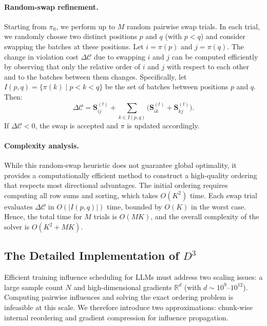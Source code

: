 \paragraph{Random-swap refinement.}
Starting from $\pi_0$, we perform up to $M$ random pairwise swap trials. 
In each trial, we randomly choose two distinct positions $p$ and $q$ (with $p<q$) and consider swapping the batches at these positions. 
Let $i = \pi(p)$ and $j = \pi(q)$. 
The change in violation cost $\Delta\mathcal{C}$ due to swapping $i$ and $j$ can be computed efficiently by observing that only the relative order of $i$ and $j$ with respect to each other and to the batches between them changes. 
Specifically, let $I(p,q) = \{\pi(k) \mid p < k < q\}$ be the set of batches between positions $p$ and $q$. 
Then:
{
\setlength{\abovedisplayskip}{8pt}
\setlength{\belowdisplayskip}{8pt}
\[
\Delta\mathcal{C} = \mathbf{S}^{(t)}_{ij} + \sum_{k \in I(p,q)} \bigl(\mathbf{S}^{(t)}_{ik} + \mathbf{S}^{(t)}_{kj}\bigr).
\]
If $\Delta\mathcal{C} < 0$, the swap is accepted and $\pi$ is updated accordingly.
}

\paragraph{Complexity analysis.}
While this random‑swap heuristic does not guarantee global optimality, it provides a computationally efficient method to construct a high‑quality ordering that respects most directional advantages. The initial ordering requires computing all row sums and sorting, which takes $O(K^2)$ time. Each swap trial evaluates $\Delta\mathcal{C}$ in $O(|I(p,q)|)$ time, bounded by $O(K)$ in the worst case. Hence, the total time for $M$ trials is $O(MK)$, and the overall complexity of the solver is $O(K^2 + MK)$.



\subsection{The Detailed Implementation of $D^3$}\label{sec:implementation}

Efficient training influence scheduling for LLMs must address two scaling issues: a large sample count $N$ and high-dimensional gradients $\mathbb{R}^d$ (with $d \sim 10^9$–$10^{12}$). Computing pairwise influences and solving the exact ordering problem is infeasible at this scale. We therefore introduce two approximations: chunk-wise internal reordering and gradient compression for influence propagation. 

